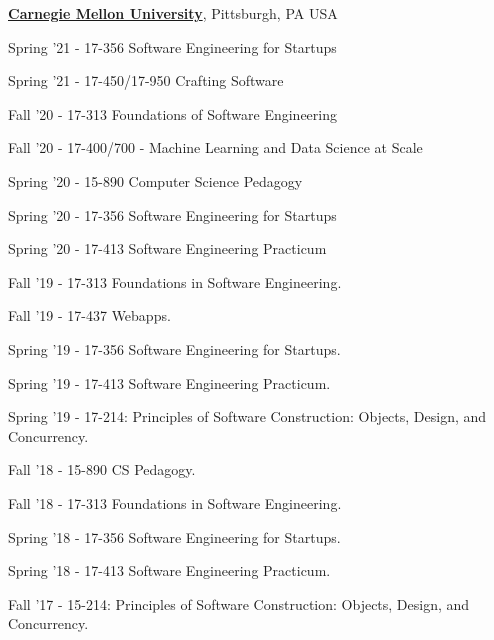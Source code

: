 \documentclass[10pt]{article}
\begin{document}
\begin{outerlist}
\item[] \href{https://www.cmu.edu/}{\textbf{Carnegie Mellon University}},
Pittsburgh, PA USA 
            \begin{innerlist}
            
            \item Spring '21 - 17-356 Software Engineering for Startups
            \item Spring '21 - 17-450/17-950 Crafting Software
            \item Fall '20 - 17-313 Foundations of Software Engineering
            \item Fall '20 - 17-400/700 - Machine Learning and Data Science at Scale
            \item Spring '20 - 15-890 Computer Science Pedagogy
            \item Spring '20 - 17-356 Software Engineering for Startups
            \item Spring '20 - 17-413 Software Engineering Practicum
            \item Fall '19 - 17-313 Foundations in Software Engineering. 
            \item Fall '19 - 17-437 Webapps.
             \item Spring '19 - 17-356 Software Engineering for Startups. 
              \item Spring '19 - 17-413 Software Engineering Practicum.
            \item Spring '19 - 17-214: Principles of Software Construction: Objects, Design, and Concurrency. 
            \item Fall '18 - 15-890 CS Pedagogy.
            \item Fall '18 - 17-313 Foundations in Software Engineering. 
             \item Spring '18 - 17-356 Software Engineering for Startups. 
              \item Spring '18 - 17-413 Software Engineering Practicum.
             \item Fall '17 - 15-214: Principles of Software Construction: Objects, Design, and Concurrency. 
\end{innerlist}






\end{outerlist}
\end{document}
